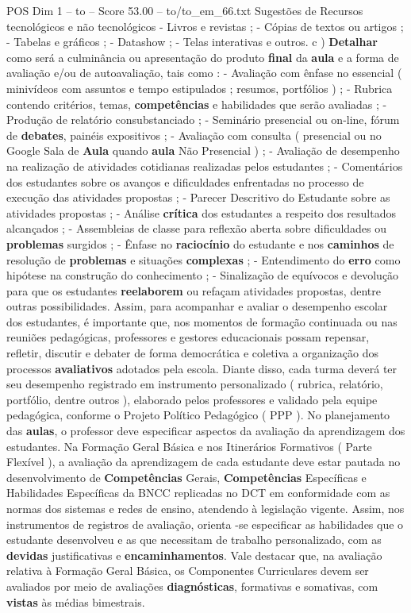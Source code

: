 \begin{textsample}{POS Dim 1 – to – Score 53.00 – to/to\_em\_66.txt}
Sugestões de Recursos tecnológicos e não tecnológicos - Livros e revistas ; - Cópias de textos ou artigos ; - Tabelas e gráficos ; - Datashow ; - Telas interativas e outros. c ) \textbf{Detalhar} como será a culminância ou apresentação do produto \textbf{final} da \textbf{aula} e a forma de avaliação e/ou de autoavaliação, tais como : - Avaliação com ênfase no essencial ( minivídeos com assuntos e tempo estipulados ; resumos, portfólios ) ; - Rubrica contendo critérios, temas, \textbf{competências} e habilidades que serão avaliadas ; - Produção de relatório consubstanciado ; - Seminário presencial ou on-line, fórum de \textbf{debates}, painéis expositivos ; - Avaliação com consulta ( presencial ou no Google Sala de \textbf{Aula} quando \textbf{aula} Não Presencial ) ; - Avaliação de desempenho na realização de atividades cotidianas realizadas pelos estudantes ; - Comentários dos estudantes sobre os avanços e dificuldades enfrentadas no processo de execução das atividades propostas ; - Parecer Descritivo do Estudante sobre as atividades propostas ; - Análise \textbf{crítica} dos estudantes a respeito dos resultados alcançados ; - Assembleias de classe para reflexão aberta sobre dificuldades ou \textbf{problemas} surgidos ; - Ênfase no \textbf{raciocínio} do estudante e nos \textbf{caminhos} de resolução de \textbf{problemas} e situações \textbf{complexas} ; - Entendimento do \textbf{erro} como hipótese na construção do conhecimento ; - Sinalização de equívocos e devolução para que os estudantes \textbf{reelaborem} ou refaçam atividades propostas, dentre outras possibilidades.
Assim, para acompanhar e avaliar o desempenho escolar dos estudantes, é importante que, nos momentos de formação continuada ou nas reuniões pedagógicas, professores e gestores educacionais possam repensar, refletir, discutir e debater de forma democrática e coletiva a organização dos processos \textbf{avaliativos} adotados pela escola.
Diante disso, cada turma deverá ter seu desempenho registrado em instrumento personalizado ( rubrica, relatório, portfólio, dentre outros ), elaborado pelos professores e validado pela equipe pedagógica, conforme o Projeto Político Pedagógico ( PPP ).
No planejamento das \textbf{aulas}, o professor deve especificar aspectos da avaliação da aprendizagem dos estudantes.
Na Formação Geral Básica e nos Itinerários Formativos ( Parte Flexível ), a avaliação da aprendizagem de cada estudante deve estar pautada no desenvolvimento de \textbf{Competências} Gerais, \textbf{Competências} Específicas e Habilidades Específicas da BNCC replicadas no DCT em conformidade com as normas dos sistemas e redes de ensino, atendendo à legislação vigente.
Assim, nos instrumentos de registros de avaliação, orienta -se especificar as habilidades que o estudante desenvolveu e as que necessitam de trabalho personalizado, com as \textbf{devidas} justificativas e \textbf{encaminhamentos}.
Vale destacar que, na avaliação relativa à Formação Geral Básica, os Componentes Curriculares devem ser avaliados por meio de avaliações \textbf{diagnósticas}, formativas e somativas, com \textbf{vistas} às médias bimestrais.


\end{textsample}
